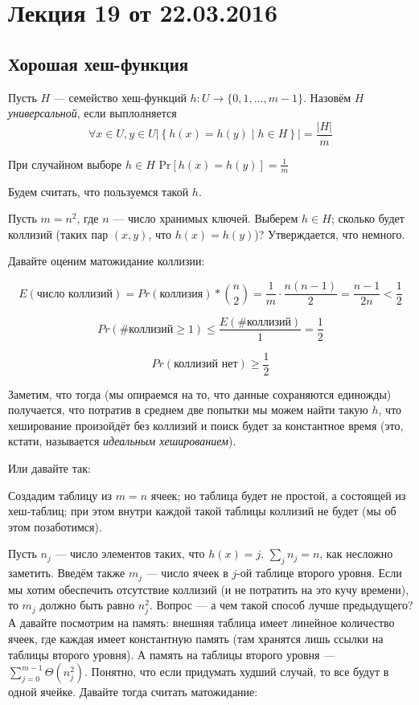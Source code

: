 



\section*{Лекция 19 от 22.03.2016}

\subsection{Хорошая хеш-функция}

Пусть $H$ --- семейство хеш-функций $h: U \to \{0, 1, \ldots, m-1\}$. Назовём $H$ \emph{универсальной}, если выплолняется
\[\forall x\in U, y\in U \left|\left\{ h(x) = h(y)\mid h\in H \right\}\right| = \frac{|H|}{m}\]

При случайном выборе $h\in H$ $\mathrm{Pr}[h(x) = h(y)] = \frac{1}{m}$

Будем считать, что пользуемся такой $h$.

Пусть $m = n^2$, где $n$ --- число хранимых ключей. Выберем $h\in H$; сколько будет коллизий (таких пар $(x, y)$, что $h(x) = h(y)$)? Утверждается, что немного.

Давайте оценим матожидание коллизии:

\[
    E(\text{число коллизий}) = Pr(\text{коллизия})*{n \choose 2} = \frac{1}{m}\cdot\frac{n(n-1)}{2} = \frac{n-1}{2n}<\frac{1}{2}
\]

\[
    Pr(\text{\# коллизий} \geqslant 1) \leqslant \frac{ E(\text{\# коллизий})}{1} = \frac{1}{2}
\]

\[
    Pr(\text{коллизий нет}) \geqslant \frac{1}{2}
\]

Заметим, что тогда (мы опираемся на то, что данные сохраняются единожды) получается, что потратив в среднем две попытки мы можем найти такую $h$, что хеширование произойдёт без коллизий и поиск будет за константное время (это, кстати, называется \emph{идеальным хешированием}).

Или давайте так:

Создадим таблицу из $m = n$ ячеек; но таблица будет не простой, а состоящей из хеш-таблиц; при этом внутри каждой такой таблицы коллизий не будет (мы об этом позаботимся).

Пусть $n_j$ --- число элементов таких, что $h(x) = j$. $\sum\limits_j n_j = n$, как несложно заметить. Введём также $m_j$ --- число ячеек в $j$-ой таблице второго уровня. Если мы хотим обеспечить отсутствие коллизий (и не потратить на это кучу времени), то $m_j$ должно быть равно $n_j^2$. Вопрос --- а чем такой способ лучше предыдущего? А давайте посмотрим на память: внешняя таблица имеет линейное количество ячеек, где каждая имеет константную память (там хранятся лишь ссылки на таблицы второго уровня). А память на таблицы второго уровня --- $\sum\limits_{j=0}^{m-1} \Theta(n_j^2)$. Понятно, что если придумать худший случай, то все будут в одной ячейке. Давайте тогда считать матожидание:

